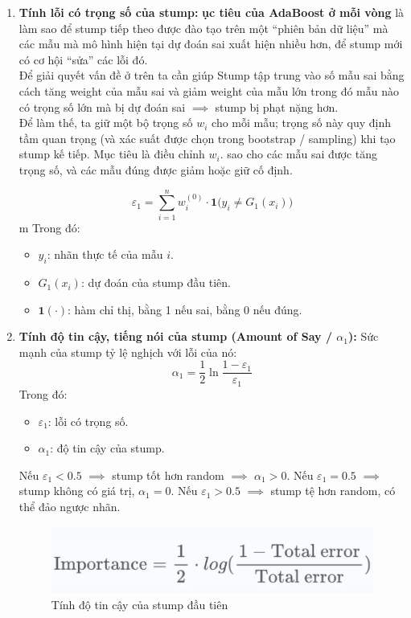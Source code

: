 \documentclass[11pt]{article}
\begin{document}
\begin{enumerate}
  \item \textbf{Tính lỗi có trọng số của stump:}  
	\textbf{ục tiêu của AdaBoost ở mỗi vòng} là làm sao để stump tiếp theo được đào tạo trên một “phiên bản dữ liệu” mà các mẫu mà mô hình hiện tại dự đoán sai xuất hiện nhiều hơn, để stump mới có cơ hội “sửa” các lỗi đó. \\
          
Để giải quyết vấn đề ở trên ta cần giúp Stump tập trung vào số mẫu sai bằng cách tăng weight của mẫu sai và giảm weight của mẫu lớn trong đó mẫu nào có trọng số lớn mà bị dự đoán sai \(\implies\) stump bị phạt nặng hơn.  \\ 

Để làm thế, ta giữ một bộ trọng số \(w_i\) cho mỗi mẫu; trọng số này quy định tầm quan trọng (và xác suất được chọn trong bootstrap / sampling) khi tạo stump kế tiếp. Mục tiêu là điều chỉnh \(w_i\). sao cho các mẫu sai được tăng trọng số, và các mẫu đúng được giảm hoặc giữ cố định. 

    \[
    \varepsilon_1 = \sum_{i=1}^n w_i^{(0)} \cdot \mathbf{1}\big(y_i \neq G_1(x_i)\big)
    \]  m
    Trong đó: 
    \begin{itemize}
        \item \(y_i\): nhãn thực tế của mẫu \(i\).  
        \item \(G_1(x_i)\): dự đoán của stump đầu tiên.  
        \item \(\mathbf{1}(\cdot)\): hàm chỉ thị, bằng 1 nếu sai, bằng 0 nếu đúng.  
    \end{itemize}
   

  \item \textbf{Tính độ tin cậy, tiếng nói của stump (Amount of Say / $\alpha_1$):}  
    Sức mạnh của stump tỷ lệ nghịch với lỗi của nó:  
    \[
    \alpha_1 = \frac{1}{2} \ln \frac{1 - \varepsilon_1}{\varepsilon_1}
    \]  
    Trong đó:  
    \begin{itemize}
        \item \(\varepsilon_1\): lỗi có trọng số.  
        \item \(\alpha_1\): độ tin cậy của stump.  
    \end{itemize}
    Nếu \(\varepsilon_1 < 0.5\) \(\implies\) stump tốt hơn random \(\implies\) \(\alpha_1 > 0\).  
    Nếu \(\varepsilon_1 = 0.5\) \(\implies\) stump không có giá trị, \(\alpha_1 = 0\).  
    Nếu \(\varepsilon_1 > 0.5\) \(\implies\) stump tệ hơn random, có thể đảo ngược nhãn.

    \begin{figure}[H]
    \centering
    \includegraphics[width=0.7\linewidth]{images/ada_pipeline_for.png}
    \caption{Tính độ tin cậy của stump đầu tiên}
    \end{figure}


\end{enumerate}
\end{document}
